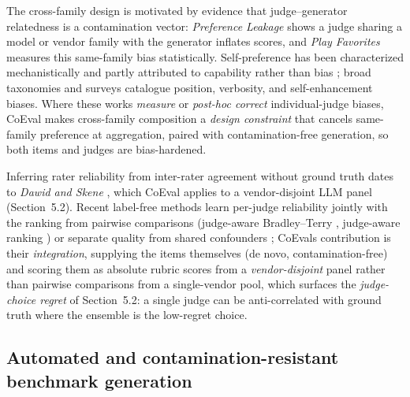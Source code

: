 The cross-family design is motivated by evidence that judge--generator relatedness is a contamination vector:
\emph{Preference Leakage} \citep{ref15} shows a judge sharing a model or vendor family with the generator
inflates scores, and \emph{Play Favorites} \citep{ref16} measures this same-family bias statistically.
Self-preference has been characterized mechanistically \citep{ref18} and partly attributed to capability
rather than bias \citep{ref24}; broad taxonomies and surveys \citep{ref17, ref19, ref20} catalogue position, verbosity, and self-enhancement biases. Where these works \emph{measure} or
\emph{post-hoc correct} individual-judge biases, CoEval makes cross-family composition a \emph{design constraint}
that cancels same-family preference at aggregation, paired with contamination-free generation, so both items and judges
are bias-hardened.

Inferring rater reliability from inter-rater agreement without ground truth dates to \emph{Dawid and Skene}
\citep{ref33}, which CoEval applies to a vendor-disjoint LLM panel (Section~5.2). Recent label-free
methods learn per-judge reliability jointly with the ranking from pairwise comparisons (judge-aware Bradley--Terry
\citep{ref27}, judge-aware ranking \citep{ref29}) or separate quality from shared confounders
\citep{ref28}; CoEval\textquotesingle s contribution is their \emph{integration}, supplying the items themselves (de novo,
contamination-free) and scoring them as absolute rubric scores from a \emph{vendor-disjoint} panel rather than
pairwise comparisons from a single-vendor pool, which surfaces the \emph{judge-choice regret} of Section~5.2: a
single judge can be anti-correlated with ground truth where the ensemble is the low-regret choice.

\subsection{Automated and contamination-resistant benchmark generation}\label{automated-and-contamination-resistant-benchmark-generation}

